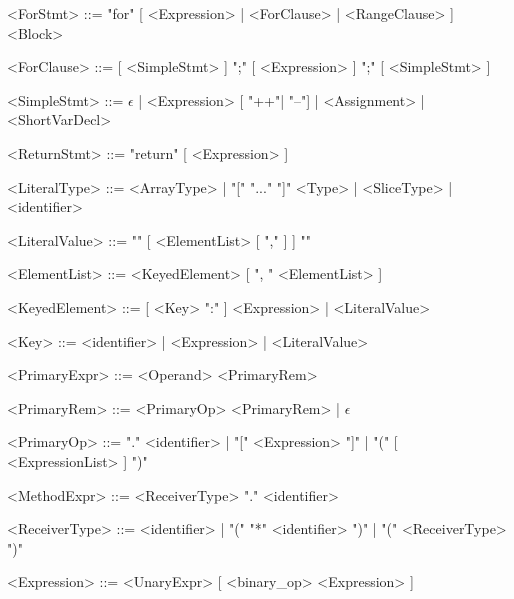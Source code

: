 \documentclass{article}
\begin{document}
\begin{grammar}
        <ForStmt>           ::=     "for" [ <Expression> | <ForClause> | <RangeClause> ] <Block>

        <ForClause>         ::=     [ <SimpleStmt> ] ";" [ <Expression> ] ";" [ <SimpleStmt> ]

        <SimpleStmt>        ::=     $\epsilon$ | <Expression> [ "++"| "--"] | <Assignment> | <ShortVarDecl>

        <ReturnStmt>        ::=     "return" [ <Expression> ]
        
        <LiteralType>       ::=     <ArrayType> | "[" "..." "]" <Type> | <SliceType> | <identifier>

        <LiteralValue>      ::=     "{" [ <ElementList> [ "," ] ] "}"

        <ElementList>       ::=     <KeyedElement> [ ", " <ElementList> ]

        <KeyedElement>      ::=     [ <Key> ":" ] <Expression> | <LiteralValue>

        <Key>               ::=     <identifier> | <Expression> | <LiteralValue>

        <PrimaryExpr>       ::=     <Operand> <PrimaryRem>

        <PrimaryRem>        ::=     <PrimaryOp> <PrimaryRem> | $\epsilon$

        <PrimaryOp>         ::=     "." <identifier> | "[" <Expression> "]" | "(" [ <ExpressionList> ] ")"

        <MethodExpr>        ::=     <ReceiverType> "." <identifier>

        <ReceiverType>      ::=     <identifier> | "(" "*" <identifier> ")" | "(" <ReceiverType> ")"

        <Expression>        ::=     <UnaryExpr> [ <binary_op> <Expression> ]


\end{grammar}
\end{document}
